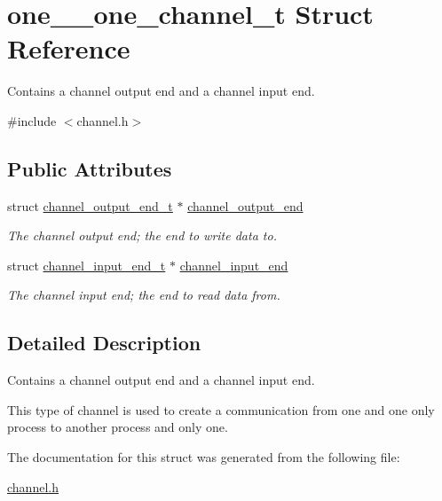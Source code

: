 \hypertarget{structone__2__one__channel__t}{\section{one\-\_\-\_\-one\-\_\-channel\-\_\-t Struct Reference}
\label{structone__2__one__channel__t}
}


Contains a channel output end and a channel input end.  




{\ttfamily \#include $<$channel.\-h$>$}

\subsection*{Public Attributes}
\begin{DoxyCompactItemize}
\item 
\hypertarget{structone__2__one__channel__t_a5d987d14f7b8a8b975c128c0a8d78a63}{struct \hyperlink{structchannel__output__end__t}{channel\-\_\-output\-\_\-end\-\_\-t} $\ast$ \hyperlink{structone__2__one__channel__t_a5d987d14f7b8a8b975c128c0a8d78a63}{channel\-\_\-output\-\_\-end}}\label{structone__2__one__channel__t_a5d987d14f7b8a8b975c128c0a8d78a63}

\begin{DoxyCompactList}\small\item\em The channel output end; the end to write data to. \end{DoxyCompactList}\item 
\hypertarget{structone__2__one__channel__t_aa6fa9e783fe71b03be9586bf19521096}{struct \hyperlink{structchannel__input__end__t}{channel\-\_\-input\-\_\-end\-\_\-t} $\ast$ \hyperlink{structone__2__one__channel__t_aa6fa9e783fe71b03be9586bf19521096}{channel\-\_\-input\-\_\-end}}\label{structone__2__one__channel__t_aa6fa9e783fe71b03be9586bf19521096}

\begin{DoxyCompactList}\small\item\em The channel input end; the end to read data from. \end{DoxyCompactList}\end{DoxyCompactItemize}


\subsection{Detailed Description}
Contains a channel output end and a channel input end. 

This type of channel is used to create a communication from one and one only process to another process and only one. 

The documentation for this struct was generated from the following file\-:\begin{DoxyCompactItemize}
\item 
\hyperlink{channel_8h}{channel.\-h}\end{DoxyCompactItemize}
